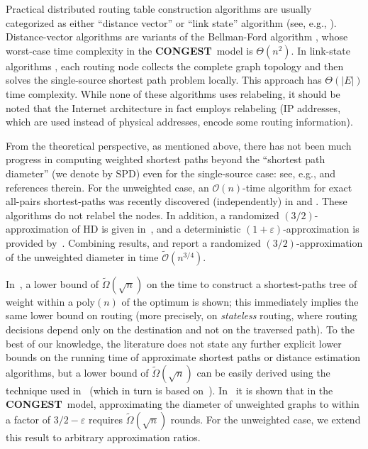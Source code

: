 \documentclass[letterpaper,11pt]{article}
\newcommand{\BO}{\mathcal{O}}
\newcommand{\CONGEST}{\textbf{CONGEST}}
\newcommand{\HD}{\mathrm{HD}}
\newcommand{\SPD}{\mathrm{SPD}}
\begin{document}
Practical distributed routing table construction algorithms are usually
categorized as either ``distance vector'' or ``link state'' algorithm (see,
e.g., \cite{PetersonD:book}). Distance-vector algorithms are variants of the
Bellman-Ford algorithm \cite{Bellman,Ford-56}, whose worst-case time complexity
in the \CONGEST\ model is $\Theta(n^2)$. In link-state algorithms
\cite{MQRR80,OSPF}, each routing node collects the complete graph topology and
then solves the single-source shortest path problem locally. This approach has
$\Theta(|E|)$ time complexity. While none of these algorithms uses relabeling,
it should be noted that the Internet architecture in fact employs relabeling (IP
addresses, which are used instead of physical addresses,  encode some routing
information).

From the theoretical perspective, as mentioned above, there has not been much
progress in computing weighted shortest paths beyond the ``shortest path
diameter'' (we denote by $\SPD$) even for the single-source case: see, e.g.,
\cite{DDP} and references therein. For the unweighted case, an $\BO(n)$-time
algorithm for exact all-pairs shortest-paths was recently discovered
(independently) in \cite{HW12} and \cite{PLT-12}. These algorithms do not
relabel the nodes. In addition, a randomized $(3/2)$-approximation of $\HD$ is
given in~\cite{PLT-12}, and a deterministic $(1+\varepsilon)$-approximation is
provided by~\cite{HW12}. Combining results, \cite{HW12} and \cite{PLT-12} report
a randomized $(3/2)$-approximation of the unweighted diameter in time
$\tilde{\BO}(n^{3/4})$.

In~\cite{DHKNPPW-11}, a lower bound of $\tilde\Omega(\sqrt{n})$ on the
time to construct a shortest-paths tree of weight within a poly$(n)$
of the optimum is shown; this immediately implies the same
lower bound on routing (more precisely, on \emph{stateless} routing,
where routing decisions depend only on the destination and not on the
traversed path). To the best of our knowledge, 
the literature does not state any further explicit lower bounds on the running
time of approximate shortest paths or distance estimation
algorithms, but  a lower bound of
$\tilde\Omega(\sqrt{n})$ can be easily derived using the 
technique used in~\cite{DHKNPPW-11} (which in turn is based
on~\cite{PelegR-00}). 
In~\cite{FHW-12} it is shown that in the \CONGEST\ model,
approximating the diameter of unweighted graphs
to within a factor of $3/2-\varepsilon$ requires
$\tilde{\Omega}(\sqrt{n})$ rounds. For the unweighted case, we extend this result
to arbitrary approximation ratios.
\end{document}
